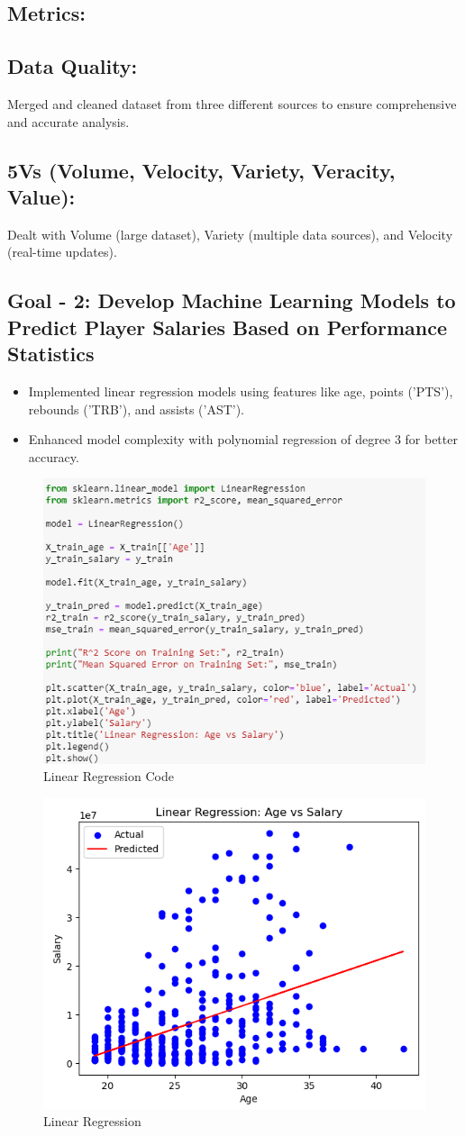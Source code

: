 \documentclass{article}
\begin{document}
\subsection*{Metrics:}
\subsection*{Data Quality:} 
Merged and cleaned dataset from three different sources to ensure comprehensive and accurate analysis.
\subsection*{5Vs (Volume, Velocity, Variety, Veracity, Value):}
Dealt with Volume (large dataset), Variety (multiple data sources), and Velocity (real-time updates).


\subsection*{Goal - 2: Develop Machine Learning Models to Predict Player Salaries Based on Performance Statistics}
\begin{itemize}
    \item Implemented linear regression models using features like age, points ('PTS'), rebounds ('TRB'), and assists ('AST').
    \item Enhanced model complexity with polynomial regression of degree 3 for better accuracy.
\end{itemize}

\FloatBarrier
\begin{figure}[h]
    \centering
    \includegraphics[width=0.5\linewidth]{LinearRegressionCode.png}
    \caption{Linear Regression Code}
    \label{fig:confusion_matrix_code}
\end{figure}

\FloatBarrier
\begin{figure}[h]
    \centering
    \includegraphics[width=0.6\linewidth]{LinearRegression.png}
    \caption{Linear Regression}
    \label{fig:confusion_matrix}
\end{figure}
\end{document}

